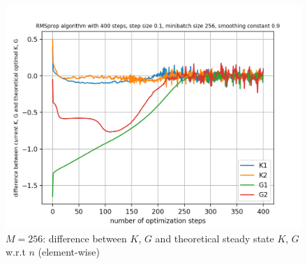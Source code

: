 \documentclass{article}
\begin{document}
\begin{figure}[h!]
\begin{minipage}[t]{.28\paperwidth}
		\includegraphics[width=1.0\textwidth]{Figures/d_M256_sep.png}
		\caption{$M=256$: difference between $K$, $G$ and theoretical steady state $K$, $G$ w.r.t $n$ (element-wise)}
	\end{minipage}
\end{figure}
\end{document}
